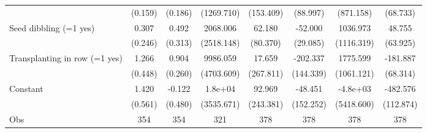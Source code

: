{\begin{tabular}{l*{7}{c}}
                    &(0.159)         &(0.186)         &(1269.710)         &(153.409)         &(88.997)         &(871.158)         &(68.733)         \\
Seed dibbling (=1 yes)&0.307         &0.492         &2068.006         &62.180         &-52.000         &1036.973         &48.755         \\
                    &(0.246)         &(0.313)         &(2518.148)         &(80.370)         &(29.085)         &(1116.319)         &(63.925)         \\
Transplanting in row (=1 yes)&1.266\sym{*}  &0.904\sym{*}  &9986.059         &17.659         &-202.337         &1775.599         &-181.887\sym{*}  \\
                    &(0.448)         &(0.260)         &(4703.609)         &(267.811)         &(144.339)         &(1061.121)         &(68.314)         \\
Constant            &1.420\sym{*}  &-0.122         &1.8e+04\sym{**} &92.969         &-48.451         &-4.8e+03         &-482.576\sym{**} \\
                    &(0.561)         &(0.480)         &(3535.671)         &(243.381)         &(152.252)         &(5418.600)         &(112.874)         \\
\hline
Obs                 &  354         &  354         &  321         &  378         &  378         &  378         &  378         \\
\hline\hline
\end{tabular}
}
